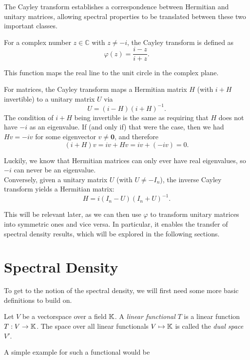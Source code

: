 The Cayley transform establishes a correspondence between Hermitian and unitary matrices,
allowing spectral properties to be translated between these two important classes.

For a complex number $z \in \mathbb{C}$ with $z \neq -i$, the Cayley transform is defined as
\[
\varphi(z) = \frac{i - z}{i + z}.
\]

This function maps the real line to the unit circle in the complex plane.

\vspace{0.5cm}



For matrices, the Cayley transform maps a Hermitian matrix $H$ (with $i + H$ invertible) to a unitary matrix $U$ via
\[
U = (i - H)(i + H)^{-1}.
\]
The condition of $i + H$ being invertible is the same as requiring that $H$ does not have $-i$ as an eigenvalue.
If (and only if) that were the case, then we had $H v = -i v$ for some eigenvector $v \neq \mathbf{0}$,
and therefore 
\[
(i + H) v = i v + H v = i v + (-i v) = 0.
\]

Luckily, we know that Hermitian matrices can only ever have real eigenvalues, so $-i$ can never be an eigenvalue.\\

Conversely, given a unitary matrix $U$ (with $U \neq -I_n$),
the inverse Cayley transform yields a Hermitian matrix:
\[
H = i (I_n - U)(I_n + U)^{-1}.
\]

This will be relevant later, as we can then use $\varphi$ to transform unitary matrices into symmetric ones and vice versa.
In particular, it enables the transfer of spectral density results,
which will be explored in the following sections.

\section{Spectral Density}

To get to the notion of the spectral density,
we will first need some more basic definitions to build on.

\begin{definition}
    Let $V$ be a vectorspace over a field $\mathbb{K}$. A \emph{linear functional} $T$ is a linear function $T: V \to \mathbb{K}$.
    The space over all linear functionals $V \mapsto \mathbb{K}$ is called the \emph{dual space} $V'$.
\end{definition}

A simple example for such a functional would be

